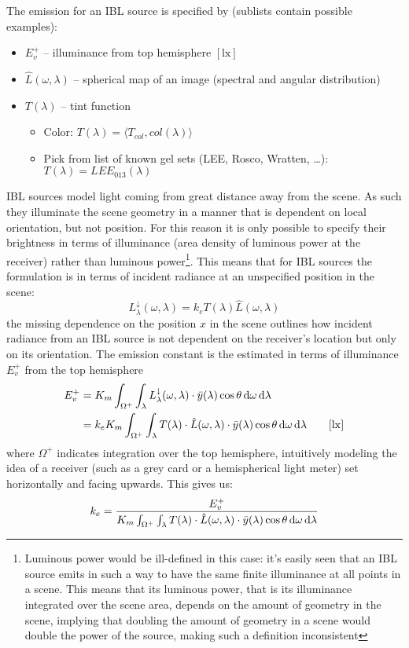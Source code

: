 The emission for an \gls{IBL} source is specified by (sublists contain possible examples):

\begin{itemize}
\item $E^+_v$ -- illuminance from top hemisphere $[\si{\lux}]$
\item $\hat{L}(\omega,\lambda)$ -- spherical map of an image (spectral and angular distribution)
\item $T(\lambda)$ -- tint function
  \begin{itemize}\small\it
  \item Color: $T(\lambda) = \langle T_{col}, col(\lambda) \rangle$
  \item Pick from list of known gel sets (LEE, Rosco, Wratten, \ldots): $T(\lambda) = LEE_{013} (\lambda)$
  \end{itemize}
\end{itemize}
\Gls{IBL} sources model light coming from great distance away from the scene. As
such they illuminate the scene geometry in a manner that is dependent on
local orientation, but not position. For this reason it is only possible to
specify their brightness in terms of illuminance (area density of luminous power
at the receiver) rather than luminous power\footnote{Luminous power would be
ill-defined in this case: it's easily seen that an \gls{IBL} source emits in
such a way to have the same finite illuminance at all points in a scene. This
means that its luminous power, that is its illuminance integrated over the scene
area, depends on the amount of geometry in the scene, implying that doubling the
amount of geometry in a scene would double the power of the source, making
such a definition inconsistent}.
This means that for \gls{IBL} sources the formulation is in terms of incident
radiance at an unspecified position in the scene:
\begin{equation}
L_{\lambda}^\downarrow(\omega,\lambda) = k_e T(\lambda) \hat{L}(\omega,\lambda)
\end{equation}
the missing dependence on the position $x$ in the scene outlines how incident
radiance from an \gls{IBL} source is not dependent on the receiver's location
but only on its orientation. The emission constant is the estimated in terms of
illuminance $E^+_v$ from the top hemisphere
\begin{align*}
E^+_v &= K_m \int_{\Omega^+} \int_\lambda L_{\lambda}^\downarrow(\omega,\lambda)
\cdot\bar y(\lambda) \cos\theta \d\omega\d\lambda \\
&= k_e K_m\int_{\Omega^+}\int_{\lambda} T(\lambda) \cdot \hat{L}(\omega,\lambda)
\cdot\bar y(\lambda) \cos\theta \d\omega\d\lambda
\qquad [\si{\lux}]
\end{align*}
where $\Omega^+$ indicates integration over the top hemisphere, intuitively
modeling the idea of a receiver (such as a grey card or a hemispherical light
meter) set horizontally and facing upwards. This gives us:
\begin{equation}
k_e = \frac{E^+_v}{K_m\int_{\Omega^+}\int_{\lambda} T(\lambda) \cdot
\hat{L}(\omega,\lambda) \cdot \bar y(\lambda)\cos\theta \mathop{}\!\mathrm{d}\omega\mathop{}\!\mathrm{d}\lambda}
\end{equation}

